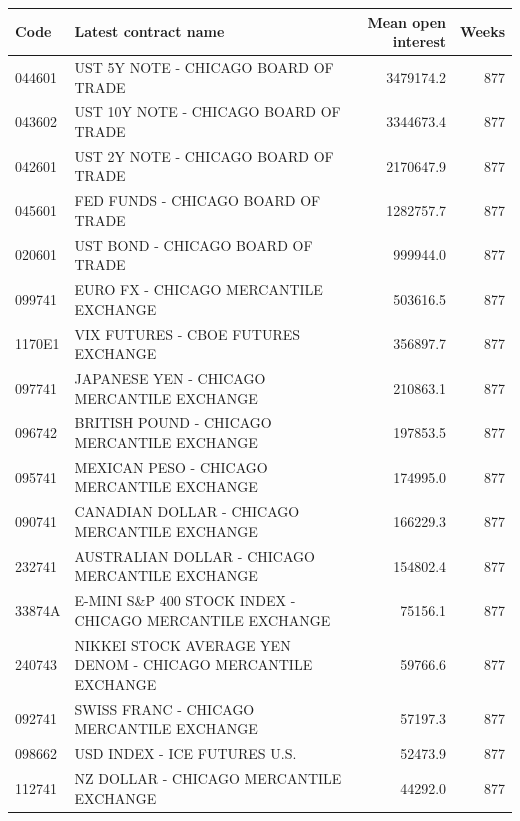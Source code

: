 \begin{center}\scriptsize\begin{longtable}{lp{7.1cm}rr}
\toprule Code & Latest contract name & Mean open interest & Weeks \\\midrule\endhead
044601 & UST 5Y NOTE - CHICAGO BOARD OF TRADE & 3479174.2 & 877 \\
043602 & UST 10Y NOTE - CHICAGO BOARD OF TRADE & 3344673.4 & 877 \\
042601 & UST 2Y NOTE - CHICAGO BOARD OF TRADE & 2170647.9 & 877 \\
045601 & FED FUNDS - CHICAGO BOARD OF TRADE & 1282757.7 & 877 \\
020601 & UST BOND - CHICAGO BOARD OF TRADE & 999944.0 & 877 \\
099741 & EURO FX - CHICAGO MERCANTILE EXCHANGE & 503616.5 & 877 \\
1170E1 & VIX FUTURES - CBOE FUTURES EXCHANGE & 356897.7 & 877 \\
097741 & JAPANESE YEN - CHICAGO MERCANTILE EXCHANGE & 210863.1 & 877 \\
096742 & BRITISH POUND - CHICAGO MERCANTILE EXCHANGE & 197853.5 & 877 \\
095741 & MEXICAN PESO - CHICAGO MERCANTILE EXCHANGE & 174995.0 & 877 \\
090741 & CANADIAN DOLLAR - CHICAGO MERCANTILE EXCHANGE & 166229.3 & 877 \\
232741 & AUSTRALIAN DOLLAR - CHICAGO MERCANTILE EXCHANGE & 154802.4 & 877 \\
33874A & E-MINI S\&P 400 STOCK INDEX - CHICAGO MERCANTILE EXCHANGE & 75156.1 & 877 \\
240743 & NIKKEI STOCK AVERAGE YEN DENOM - CHICAGO MERCANTILE EXCHANGE & 59766.6 & 877 \\
092741 & SWISS FRANC - CHICAGO MERCANTILE EXCHANGE & 57197.3 & 877 \\
098662 & USD INDEX - ICE FUTURES U.S. & 52473.9 & 877 \\
112741 & NZ DOLLAR - CHICAGO MERCANTILE EXCHANGE & 44292.0 & 877 \\
\bottomrule\end{longtable}\end{center}